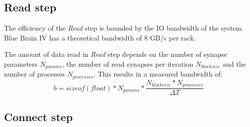 \subsection{Read step}
The efficiency of the \emph{Read} step is bounded by the IO bandwidth of the system.
Blue Brain IV has a theoretical bandwidth of $8$ GB/s per rack.

The amount of data read in \emph{Read} step depends on the number of synapse parameters $N_{params}$,
the number of read synapses per iteration $N_{blocksize}$ and the number of processes $N_{processes}$.
This results in a measured bandwidth of:
\begin{equation}
b = sizeof(float) * N_{params} * \frac{N_{blocksize} * N_{processes}}{\Delta T}
\end{equation}
\subsection{Connect step}

